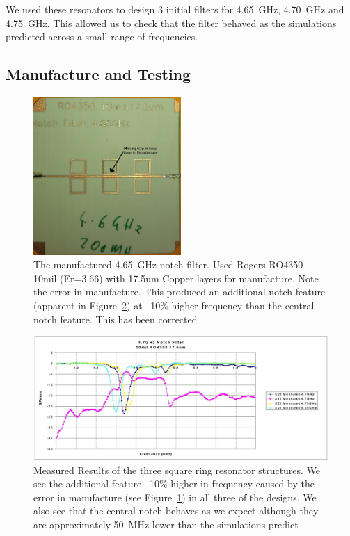 We used these resonators to design 3 initial filters for 4.65~GHz, 4.70~GHz and 4.75~GHz. This allowed us to check that the filter behaved as the simulations predicted across a small range of frequencies.
\clearpage
\subsection{Manufacture and Testing}

\begin{figure}
 \centering
 \includegraphics[width=0.5\textwidth]{./images/NotchFilter/IMAG0148.jpg}
 \caption{The manufactured 4.65~GHz notch filter. Used Rogers RO4350 10mil (Er=3.66) with 17.5um Copper layers for manufacture. Note the error in manufacture. This produced an additional notch feature (apparent in Figure~\ref{fig:MeasuredResults}) at ~10\% higher frequency than the central notch feature. This has been corrected}
 \label{fig:4_65GHzFilter}
\end{figure}


\begin{figure}
 \centering
 \includegraphics[width=\textwidth]{./images/NotchFilter/MeauredResults.JPG}
 \caption{Measured Results of the three square ring resonator structures. We see the additional feature ~10\% higher in frequency caused by the error in manufacture (see Figure~\ref{fig:4_65GHzFilter}) in all three of the designs. We also see that the central notch behaves as we expect although they are approximately 50~MHz lower than the simulations predict}
 \label{fig:MeasuredResults}
\end{figure}

